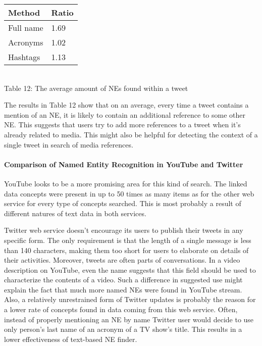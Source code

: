 \begin{center}
  \begin{tabular}{ | p{4cm} | p{2cm} | } \hline
    Method & Ratio \\ \hline
    Full name & 1.69 \\ \hline
    Acronyms & 1.02 \\ \hline
    Hashtags & 1.13 \\ \hline
  \end{tabular} \\
  Table 12: The average amount of NEs found within a tweet \\
\end{center}

The results in Table 12 show that on an average, every time a tweet contains a mention of an NE,
it is likely to contain an additional reference to some other NE. This suggests that users try to add
more references to a tweet when it's already related to media. This might also be helpful for detecting the
context of a single tweet in search of media references.

\paragraph{Comparison of Named Entity Recognition in YouTube and Twitter}
YouTube looks to be a more promising area for this kind of search. The
linked data concepts were present in up to 50 times as many items as for the other
web service for every type of concepts searched. This is most probably a
result of different natures of text data in both services.

Twitter web service doesn't encourage its users to publish their tweets in any
specific form. The only requirement is that the length of a single message
is less than 140 characters, making them too short for users to elaborate
on details of their activities. Moreover, tweets are often parts of
conversations. In a video description on YouTube, even the name
suggests that this field should be used to characterize the contents
of a video. Such a difference in suggested use might explain the fact that
much more named NEs were found in YouTube stream. Also, a relatively
unrestrained form of Twitter updates is probably the reason for a lower rate of
concepts found in data coming from this web service. Often, instead of properly
mentioning an NE by name Twitter user would decide to use only person's
last name of an acronym of a TV show's title. This results in a
lower effectiveness of text-based NE finder.

